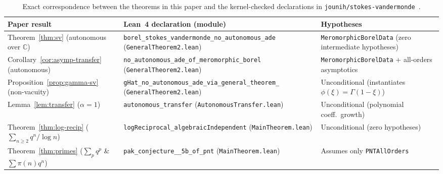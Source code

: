 \documentclass[10pt,reqno]{amsart}
\numberwithin{equation}{section}
\theoremstyle{definition}
\newcommand{\C}{\mathbb{C}}
\begin{document}
\begin{table}[ht]
\centering
\footnotesize
\renewcommand{\arraystretch}{1.24}
\begin{tabular}{@{} >{\raggedright\arraybackslash}p{4.1cm} >{\raggedright\arraybackslash}p{6.6cm} >{\raggedright\arraybackslash}p{4.3cm} @{}}
\toprule
\textbf{Paper result} & \textbf{Lean~4 declaration (module)} & \textbf{Hypotheses} \\
\midrule
Theorem~\ref{thm:sv} (autonomous over $\C$) &
\texttt{borel\_\allowbreak stokes\_\allowbreak vandermonde\_\allowbreak no\_\allowbreak autonomous\_\allowbreak ade} (\texttt{GeneralTheorem2.lean}) &
\texttt{MeromorphicBorelData} (zero intermediate hypotheses) \\
Corollary~\ref{cor:asymp-transfer} (autonomous) &
\texttt{no\_\allowbreak autonomous\_\allowbreak ade\_\allowbreak of\_\allowbreak meromorphic\_\allowbreak borel} (\texttt{GeneralTheorem2.lean}) &
\texttt{MeromorphicBorelData} + all-orders asymptotics \\
Proposition~\ref{prop:gamma-sv} (non-vacuity) &
\texttt{gHat\_\allowbreak no\_\allowbreak autonomous\_\allowbreak ade\_\allowbreak via\_\allowbreak general\_\allowbreak theorem\_\allowbreak 2} (\texttt{GeneralTheorem2.lean}) &
Unconditional (instantiates $\phi(\xi)=\Gamma(1-\xi)$) \\
Lemma~\ref{lem:transfer} ($\alpha = 1$) &
\texttt{autonomous\_\allowbreak transfer} (\texttt{AutonomousTransfer.lean}) &
Unconditional (polynomial coeff.\ growth) \\
Theorem~\ref{thm:log-recip} ($\sum_{n \ge 2} q^n/\log n$) &
\texttt{logReciprocal\_\allowbreak algebraicIndependent} (\texttt{MainTheorem.lean}) &
Unconditional (zero hypotheses) \\
Theorem~\ref{thm:primes} ($\sum_p q^p$ \& $\sum \pi(n) q^n$) &
\texttt{pak\_\allowbreak conjecture\_\allowbreak 2\_\allowbreak 5b\_\allowbreak of\_\allowbreak pnt} (\texttt{MainTheorem.lean}) &
Assumes only \texttt{PNTAllOrders} \\
\bottomrule
\end{tabular}
\vspace{4pt}
\caption{Exact correspondence between the theorems in this paper and the kernel-checked declarations in \texttt{jounih/stokes-vandermonde}~\cite{Helminen2026StokesVandermonde}.}\label{tab:lean}
\end{table}
\end{document}
